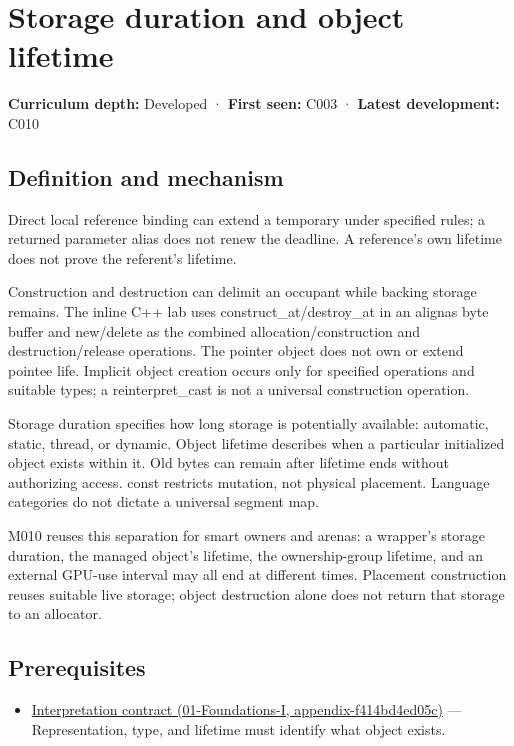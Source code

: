 \hypertarget{appendix-0b104bcba06b}{}
\section{Storage duration and object lifetime}\label{appendix-0b104bcba06b-storage-duration-and-object-lifetime}

\textbf{Curriculum depth:} Developed · \textbf{First seen:} C003 · \textbf{Latest development:} C010

\subsection{Definition and mechanism}\label{appendix-0b104bcba06b-definition-and-mechanism}

Direct local reference binding can extend a temporary under specified rules; a returned parameter alias does not renew the deadline. A reference's own lifetime does not prove the referent's lifetime.

Construction and destruction can delimit an occupant while backing storage remains. The inline C++ lab uses construct\_at/destroy\_at in an alignas byte buffer and new/delete as the combined allocation/construction and destruction/release operations. The pointer object does not own or extend pointee life. Implicit object creation occurs only for specified operations and suitable types; a reinterpret\_cast is not a universal construction operation.

Storage duration specifies how long storage is potentially available: automatic, static, thread, or dynamic. Object lifetime describes when a particular initialized object exists within it. Old bytes can remain after lifetime ends without authorizing access. const restricts mutation, not physical placement. Language categories do not dictate a universal segment map.

M010 reuses this separation for smart owners and arenas: a wrapper's storage duration, the managed object's lifetime, the ownership-group lifetime, and an external GPU-use interval may all end at different times. Placement construction reuses suitable live storage; object destruction alone does not return that storage to an allocator.

\subsection{Prerequisites}\label{appendix-0b104bcba06b-prerequisites}

\begin{itemize}
\tightlist
\item
  \href{../01-Foundations-I/main.pdf\#nameddest=appendix-f414bd4ed05c}{Interpretation contract (01-Foundations-I, appendix-f414bd4ed05c)} --- Representation, type, and lifetime must identify what object exists.
\end{itemize}

